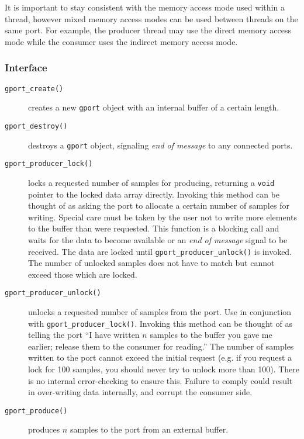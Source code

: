 It is important to stay consistent with the memory access mode used within a
thread, however mixed memory access modes can be used between threads on the
same port.
For example, the producer thread may use the direct memory access mode while
the consumer uses the indirect memory access mode.

\subsubsection{Interface}
\label{module:buffer:gport:interface}

\begin{description}
\item[{\tt gport\_create()}]
    creates a new {\tt gport} object with an internal buffer of a certain
    length.
\item[{\tt gport\_destroy()}]
    destroys a {\tt gport} object, signaling {\it end of message} to any
    connected ports.
\item[{\tt gport\_producer\_lock()}]
    locks a requested number of samples for producing, returning a {\tt void}
    pointer to the locked data array directly.
    Invoking this method can be thought of as asking the port to allocate a
    certain number of samples for writing.
    Special care must be taken by the user not to write more elements to the
    buffer than were requested.
    This function is a blocking call and waits for the data to become
    available or an {\it end of message} signal to be received.
    The data are locked until {\tt gport\_producer\_unlock()} is invoked.
    The number of unlocked samples does not have to match but cannot exceed
    those which are locked.
\item[{\tt gport\_producer\_unlock()}]
    unlocks a requested number of samples from the port.
    Use in conjunction with {\tt gport\_producer\_lock()}.
    Invoking this method can be thought of as telling the port ``I have
    written $n$ samples to the buffer you gave me earlier; release them to the
    consumer for reading.''
    The number of samples written to the port cannot exceed the initial
    request (e.g. if you request a lock for 100 samples, you should never try
    to unlock more than 100).
    There is no internal error-checking to ensure this.
    Failure to comply could result in over-writing data internally, and
    corrupt the consumer side.
\item[{\tt gport\_produce()}]
    produces $n$ samples to the port from an external buffer.

\end{description}
